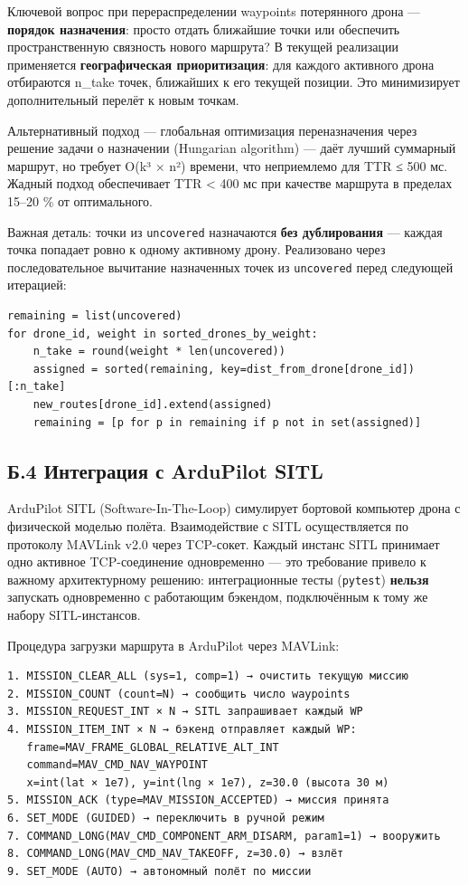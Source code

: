 \documentclass[14pt,a4paper]{extarticle}
\begin{document}
Ключевой вопрос при перераспределении waypoints потерянного дрона --- \textbf{порядок назначения}: просто отдать ближайшие точки или обеспечить пространственную связность нового маршрута? В текущей реализации применяется \textbf{географическая приоритизация}: для каждого активного дрона отбираются n\_take точек, ближайших к его текущей позиции. Это минимизирует дополнительный перелёт к новым точкам.

Альтернативный подход --- глобальная оптимизация переназначения через решение задачи о назначении (Hungarian algorithm) --- даёт лучший суммарный маршрут, но требует O(k³ × n²) времени, что неприемлемо для TTR ≤ 500 мс. Жадный подход обеспечивает TTR \textless{} 400 мс при качестве маршрута в пределах 15--20 \% от оптимального.

Важная деталь: точки из \texttt{uncovered} назначаются \textbf{без дублирования} --- каждая точка попадает ровно к одному активному дрону. Реализовано через последовательное вычитание назначенных точек из \texttt{uncovered} перед следующей итерацией:

\begin{verbatim}
remaining = list(uncovered)
for drone_id, weight in sorted_drones_by_weight:
    n_take = round(weight * len(uncovered))
    assigned = sorted(remaining, key=dist_from_drone[drone_id])[:n_take]
    new_routes[drone_id].extend(assigned)
    remaining = [p for p in remaining if p not in set(assigned)]
\end{verbatim}

\hypertarget{ux431.4-ux438ux43dux442ux435ux433ux440ux430ux446ux438ux44f-ux441-ardupilot-sitl}{%
\subsection{Б.4 Интеграция с ArduPilot SITL}\label{ux431.4-ux438ux43dux442ux435ux433ux440ux430ux446ux438ux44f-ux441-ardupilot-sitl}}

ArduPilot SITL (Software-In-The-Loop) симулирует бортовой компьютер дрона с физической моделью полёта. Взаимодействие с SITL осуществляется по протоколу MAVLink v2.0 через TCP-сокет. Каждый инстанс SITL принимает одно активное TCP-соединение одновременно --- это требование привело к важному архитектурному решению: интеграционные тесты (\texttt{pytest}) \textbf{нельзя} запускать одновременно с работающим бэкендом, подключённым к тому же набору SITL-инстансов.

Процедура загрузки маршрута в ArduPilot через MAVLink:

\begin{verbatim}
1. MISSION_CLEAR_ALL (sys=1, comp=1) → очистить текущую миссию
2. MISSION_COUNT (count=N) → сообщить число waypoints
3. MISSION_REQUEST_INT × N → SITL запрашивает каждый WP
4. MISSION_ITEM_INT × N → бэкенд отправляет каждый WP:
   frame=MAV_FRAME_GLOBAL_RELATIVE_ALT_INT
   command=MAV_CMD_NAV_WAYPOINT
   x=int(lat × 1e7), y=int(lng × 1e7), z=30.0 (высота 30 м)
5. MISSION_ACK (type=MAV_MISSION_ACCEPTED) → миссия принята
6. SET_MODE (GUIDED) → переключить в ручной режим
7. COMMAND_LONG(MAV_CMD_COMPONENT_ARM_DISARM, param1=1) → вооружить
8. COMMAND_LONG(MAV_CMD_NAV_TAKEOFF, z=30.0) → взлёт
9. SET_MODE (AUTO) → автономный полёт по миссии
\end{verbatim}
\end{document}
